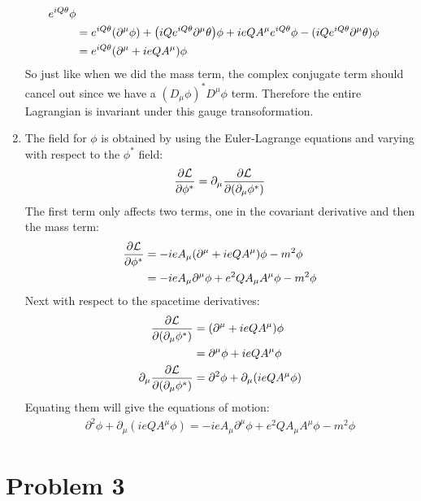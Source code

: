 \documentclass[12pt]{article}
\renewcommand{\L}{\mathcal{L}}
\newcommand{\D}{\partial}
\begin{document}
\begin{enumerate}[label=\alph*)]
\begin{align*}
    e^{iQ\theta}\phi\\
    &=e^{iQ\theta}(\D^\mu\phi)+\qty(iQe^{iQ\theta}\D^\mu\theta)\phi+
    ieQA^\mu e^{iQ\theta}\phi-(iQe^{iQ\theta}\D^\mu\theta)\phi\\
    &=e^{iQ\theta}\qty(\D^\mu+ieQA^\mu)\phi
  \end{align*}
  So just like when we did the mass term, the complex conjugate term should cancel out since we have a $(D_\mu\phi)^*D^\mu\phi$ term. Therefore the entire Lagrangian is invariant under this gauge transoformation. 
\item The field for $\phi$ is obtained by using the Euler-Lagrange equations and varying with respect to the $\phi^*$ field:
  \begin{align*}
    \pdv{\L}{\phi^*}=\D_\mu\pdv{\L}{(\D_\mu\phi^*)}
  \end{align*}
  The first term only affects two terms, one in the covariant derivative and then the mass term:
  \begin{align*}
    \pdv{\L}{\phi^*}&=-ieA_\mu\qty(\D^\mu+ieQA^\mu)\phi-m^2\phi\\
    &=-ieA_\mu\D^\mu\phi+e^2QA_\mu A^\mu\phi-m^2\phi
  \end{align*}
  Next with respect to the spacetime derivatives:
  \begin{align*}
    \pdv{\L}{(\D_\mu\phi^*)}&=\qty(\D^\mu+ieQA^\mu)\phi\\
    &=\D^\mu\phi+ieQA^\mu\phi\\
    \D_\mu\pdv{\L}{(\D_\mu\phi^*)}&=\D^2\phi+\D_\mu\qty(ieQA^\mu\phi)
  \end{align*}
  Equating them will give the equations of motion:
  \begin{align*}
    \D^2\phi+\D_\mu(ieQA^\mu\phi)=-ieA_\mu\D^\mu\phi+e^2QA_\mu A^\mu\phi-m^2\phi
  \end{align*}
\end{enumerate}
\section*{Problem 3}
\end{document}

